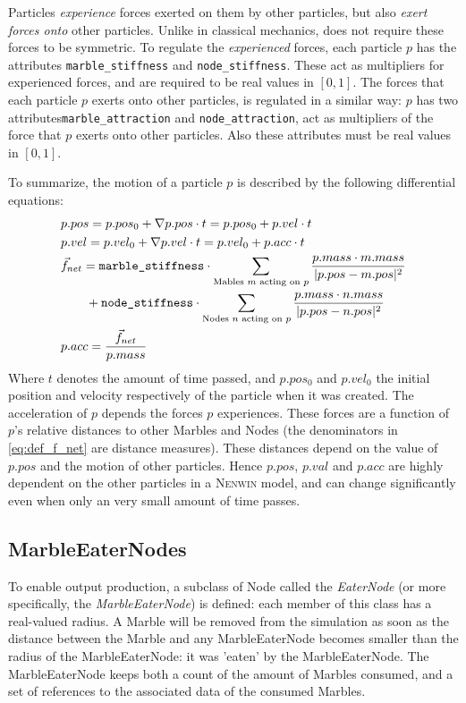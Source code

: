 Particles \textit{experience} forces exerted on them by other particles, but also \textit{exert forces onto} other particles. Unlike in classical mechanics, \nenwin does not require these forces to be symmetric. 
To regulate the \textit{experienced} forces, each particle $p$ has the attributes \texttt{marble\_stiffness} and \texttt{node\_stiffness}. These act as multipliers for experienced forces, and are required to be real values in $[0, 1]$.
The forces that each particle $p$ exerts onto other particles, is regulated in a similar way: $p$ has two attributes\texttt{marble\_attraction} and \texttt{node\_attraction}, act as multipliers of the force that $p$ exerts onto other particles. Also these attributes must be real values in $[0, 1]$. 

To summarize, the motion of a particle $p$ is described by the following differential equations:
\begin{align}
    &p.pos = p.pos_0 + \nabla p.pos \cdot t  = p.pos_0 + p.vel \cdot t \label{eq:def_pos} \\
    &p.vel = p.vel_0 + \nabla p.vel \cdot t = p.vel_0 + p.acc \cdot t \label{eq:def_vel}\\
    &\vec{f}_{net}  = \texttt{marble\_stiffness} \cdot \sum_{\text{Mables $m$ acting on $p$}} \frac{p.mass \cdot m.mass}{\lvert p.pos - m.pos \rvert^2} \nonumber \\
    & \qquad + \texttt{node\_stiffness} \cdot \sum_{\text{Nodes $n$ acting on $p$}} \frac{p.mass \cdot n.mass}{\lvert p.pos - n.pos \rvert^2} \label{eq:def_f_net}\\
    &p.acc = \frac{\vec{f}_{net}}{p.mass} \label{eq:def_acc}
\end{align}
Where $t$ denotes the amount of time passed, and $p.pos_0$ and $p.vel_0$ the initial position and velocity respectively of the particle when it was created.
The acceleration of $p$ depends the forces $p$ experiences. These forces are a function of $p$'s relative distances to other Marbles and Nodes (the denominators in \eqref{eq:def_f_net} are distance measures). These distances depend on the value of $p.pos$ and the motion of other particles. Hence $p.pos$, $p.val$ and $p.acc$ are highly dependent on the other particles in a \textsc{Nenwin} model, and can change significantly even when only an very small amount of time passes.

\subsection{MarbleEaterNodes}
To enable output production, a subclass of Node called the \textit{EaterNode} (or more specifically, the \textit{MarbleEaterNode}) is defined: 
each member of this class has a real-valued radius. 
A Marble will be removed from the simulation as soon as the distance between the Marble and any MarbleEaterNode 
becomes smaller than the radius of the MarbleEaterNode: it was 'eaten' by the MarbleEaterNode.
The MarbleEaterNode keeps both a count of the amount of Marbles consumed, 
and a set of references to the associated data of the consumed Marbles.

